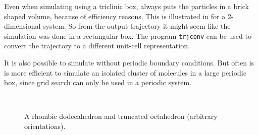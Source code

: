 Even when simulating using a triclinic box, {\gromacs} always puts the
particles in a brick shaped volume, because of efficiency reasons.
This is illustrated in  for a 2-dimensional system.
So from the output trajectory it might seem like the simulation was done in
a rectangular box. The program {\tt trjconv} can be used to convert the
trajectory to a different unit-cell representation.

It is also possible to simulate without periodic boundary conditions.
But often is is more efficient to simulate an isolated cluster of molecules
in a large periodic box, since grid search can only be used in a periodic
system.

\begin{figure}
\centerline{
~~~~
}
\caption {A rhombic dodecahedron and truncated octahedron
(arbitrary orientations).}
\label{fig:boxshapes}
\end{figure}

